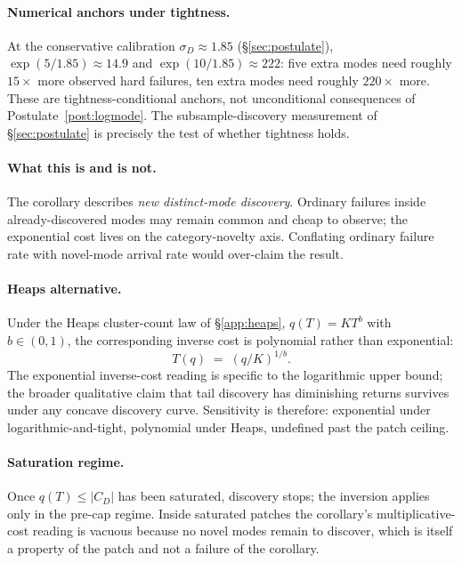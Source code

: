 \documentclass{article}
\theoremstyle{taeplain}
\theoremstyle{taedefn}
\newcommand{\teApprox}{\ensuremath{\approx}}
\begin{document}
\paragraph{Numerical anchors under tightness.}
At the conservative calibration $\sigma_D \teApprox 1.85$ (\S\ref{sec:postulate}), $\exp(5/1.85) \teApprox 14.9$ and $\exp(10/1.85) \teApprox 222$: five extra modes need roughly $15\times$ more observed hard failures, ten extra modes need roughly $220\times$ more. These are tightness-conditional anchors, not unconditional consequences of Postulate~\ref{post:logmode}. The subsample-discovery measurement of \S\ref{sec:postulate} is precisely the test of whether tightness holds.

\paragraph{What this is and is not.}
The corollary describes \emph{new distinct-mode discovery}. Ordinary failures inside already-discovered modes may remain common and cheap to observe; the exponential cost lives on the category-novelty axis. Conflating ordinary failure rate with novel-mode arrival rate would over-claim the result.

\paragraph{Heaps alternative.}
Under the Heaps cluster-count law of \S\ref{app:heaps}, $q(T) = K T^b$ with $b \in (0,1)$, the corresponding inverse cost is polynomial rather than exponential:
\[
T(q) \;=\; (q/K)^{1/b}.
\]
The exponential inverse-cost reading is specific to the logarithmic upper bound; the broader qualitative claim that tail discovery has diminishing returns survives under any concave discovery curve. Sensitivity is therefore: exponential under logarithmic-and-tight, polynomial under Heaps, undefined past the patch ceiling.

\paragraph{Saturation regime.}
Once $q(T) \leq |C_D|$ has been saturated, discovery stops; the inversion applies only in the pre-cap regime. Inside saturated patches the corollary's multiplicative-cost reading is vacuous because no novel modes remain to discover, which is itself a property of the patch and not a failure of the corollary.
\end{document}
